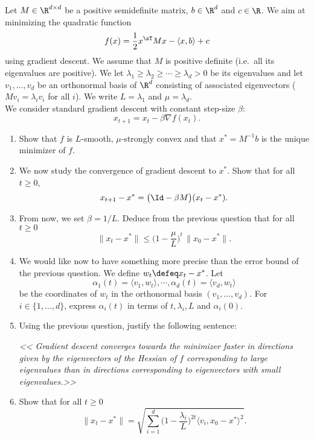 \documentclass[11pt,nocut]{article}
\begin{document}
\begin{problem}[5 points]\label{p:grad}
	Let $M \in \R^{d \times d}$ be a positive semidefinite matrix, $b \in \R^d$ and $c \in \R$. We aim at minimizing the quadratic function
	$$
	f(x) = \frac{1}{2} x^{\sT} M x - \langle x,b \rangle + c
	$$
	using gradient descent. 
	We assume that $M$ is positive definite (i.e.\ all its eigenvalues are positive).
	We let $\lambda_1 \geq \lambda_2 \geq \cdots \geq \lambda_d >0$ be its eigenvalues and let $v_1, \dots, v_d$ be an orthonormal basis of $\R^d$ consisting of associated eigenvectors ($Mv_i = \lambda_i v_i$ for all $i$).
	We write $L = \lambda_1$ and $\mu = \lambda_d$.
	\\

	We consider standard gradient descent with constant step-size $\beta$:
$$
x_{t+1} = x_t - \beta \nabla f(x_t).
$$
	\begin{enumerate}[label=\normalfont(\textbf{\alph*})]
		\item Show that $f$ is $L$-smooth, $\mu$-strongly convex and that $x^* = M^{-1} b$ is the unique minimizer of $f$.
		\item We now study the convergence of gradient descent to $x^*$. Show that for all $t \geq 0$,
			$$
			x_{t+1} - x^* = \big(\Id - \beta M \big)(x_t - x^*).
			$$
		\item From now, we set $\beta = 1/L$. Deduce from the previous question that for all $t \geq 0$
			$$
			\|x_t - x^* \| \leq \Big(1- \frac{\mu}{L}\Big)^{\! t} \, \|x_0 - x^*\|.
			$$
		\item We would like now to have something more precise than the error bound of the previous question. We define $w_t \defeq x_t -x^*$. Let 
			$$
			\alpha_1(t) = \langle v_1, w_t \rangle, \cdots, \alpha_d(t) = \langle v_d, w_t \rangle
			$$
			be the coordinates of $w_t$ in the orthonormal basis $(v_1, \dots, v_d)$.
			For $i \in \{1, \dots, d\}$, express $\alpha_i(t)$ in terms of $t,\lambda_i,L$ and $\alpha_i(0)$. 
		\item Using the previous question, justify the following sentence:
			\begin{center}
			\emph{
				<< Gradient descent converges towards the minimizer faster in directions given  by the eigenvectors of the Hessian of $f$ corresponding to large eigenvalues than in directions corresponding to eigenvectors with small eigenvalues.>>
			}
			\end{center}
		\item Show that for all $t \geq 0$
			$$
			\|x_t - x^* \| = \sqrt{\sum_{i=1}^d \Big(1-\frac{\lambda_i}{L}\Big)^{\!2t} \big\langle v_i, x_0-x^* \big\rangle^2}.
			$$
	\end{enumerate}
\end{problem}
\end{document}
